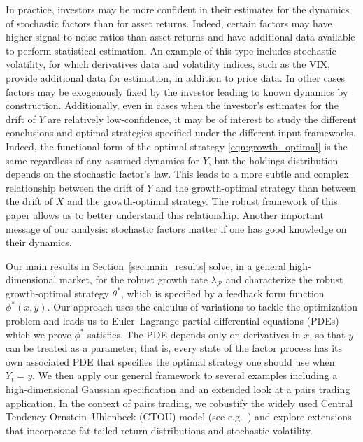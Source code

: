 \documentclass{article}
\theoremstyle{plain}
\theoremstyle{definition}
\newcommand{\Pcal}{{\mathcal P}}
\numberwithin{lem}{section}
\begin{document}
In practice, investors may be more confident in their estimates for the dynamics of stochastic factors than for asset returns. Indeed, certain factors may have higher signal-to-noise ratios than asset returns and have additional data available to perform statistical estimation. An example of this type includes stochastic volatility, for which derivatives data and volatility indices, such as the VIX, provide additional data for estimation, in addition to price data. In other cases factors may be exogenously fixed by the investor leading to known dynamics by construction. Additionally, even in cases when the investor's estimates for the drift of $Y$ are relatively low-confidence, it may be of interest to study the different conclusions and optimal strategies specified under the different input frameworks. Indeed, the functional form of the optimal strategy \eqref{eqn:growth_optimal} is the same regardless of any assumed dynamics for $Y$, but the holdings distribution depends on the stochastic factor's law. 
This leads to a more subtle and complex relationship between the drift of $Y$ and the growth-optimal strategy than between the drift of $X$ and the growth-optimal strategy. The robust framework of this paper allows us to better understand this relationship. Another important message of our analysis: stochastic factors matter if one has good knowledge on their dynamics.

Our main results in Section~\ref{sec:main_results} solve, in a general high-dimensional market, for the robust growth rate $\lambda_{\Pcal}$ and characterize the robust growth-optimal strategy $\theta^*$, which is specified by a feedback form function $\phi^*(x,y)$. Our approach uses the calculus of variations to tackle the optimization problem and leads us to Euler--Lagrange partial differential equations (PDEs) which we prove $\phi^*$ satisfies. The PDE depends only on derivatives in $x$, so that $y$ can be treated as a parameter; that is, every state of the factor process has its own associated PDE that specifies the optimal strategy one should use when $Y_t = y$. 
We then apply our general framework to several examples including a high-dimensional Gaussian specification and an extended look at a pairs trading application. In the context of pairs trading, we robustify the widely used Central Tendency Ornstein--Uhlenbeck (CTOU) model (see e.g.\ \cite{leung2018optimal,liu2017intraday}) and explore extensions that incorporate fat-tailed return distributions and stochastic volatility.
\end{document}
